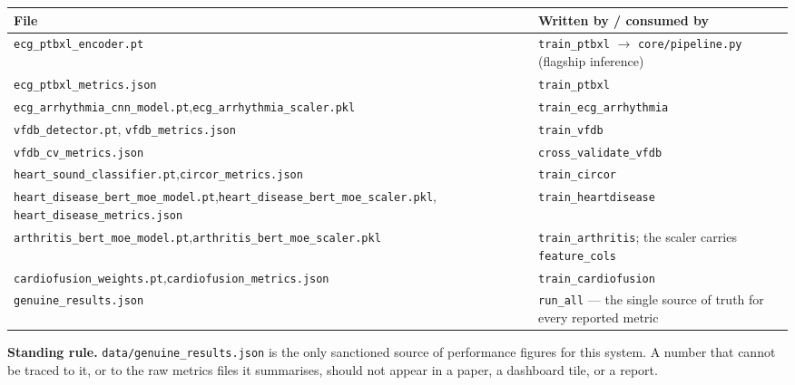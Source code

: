 \documentclass[11pt,a4paper]{article}
\newcommand{\code}[1]{\texttt{\small #1}}
\begin{document}
\begin{center}
\footnotesize
\begin{tabular}{@{}p{6.6cm}p{8.0cm}@{}}
\toprule
\textbf{File} & \textbf{Written by / consumed by}\\
\midrule
\code{ecg\_ptbxl\_encoder.pt} & \code{train\_ptbxl} $\rightarrow$
\code{core/pipeline.py} (flagship inference)\\
\code{ecg\_ptbxl\_metrics.json} & \code{train\_ptbxl}\\
\code{ecg\_arrhythmia\_cnn\_model.pt},\newline\code{ecg\_arrhythmia\_scaler.pkl} &
\code{train\_ecg\_arrhythmia}\\
\code{vfdb\_detector.pt}, \code{vfdb\_metrics.json} & \code{train\_vfdb}\\
\code{vfdb\_cv\_metrics.json} & \code{cross\_validate\_vfdb}\\
\code{heart\_sound\_classifier.pt},\newline\code{circor\_metrics.json} &
\code{train\_circor}\\
\code{heart\_disease\_bert\_moe\_model.pt},\newline\code{heart\_disease\_bert\_moe\_scaler.pkl},
\newline\code{heart\_disease\_metrics.json} & \code{train\_heartdisease}\\
\code{arthritis\_bert\_moe\_model.pt},\newline\code{arthritis\_bert\_moe\_scaler.pkl} &
\code{train\_arthritis}; the scaler carries \code{feature\_cols}\\
\code{cardiofusion\_weights.pt},\newline\code{cardiofusion\_metrics.json} &
\code{train\_cardiofusion}\\
\code{genuine\_results.json} & \code{run\_all} --- the single source of
truth for every reported metric\\
\bottomrule
\end{tabular}
\end{center}

\vspace{1em}
\begin{notebox}
\textbf{Standing rule.} \code{data/genuine\_results.json} is the only
sanctioned source of performance figures for this system. A number that
cannot be traced to it, or to the raw metrics files it summarises, should
not appear in a paper, a dashboard tile, or a report.
\end{notebox}
\end{document}
